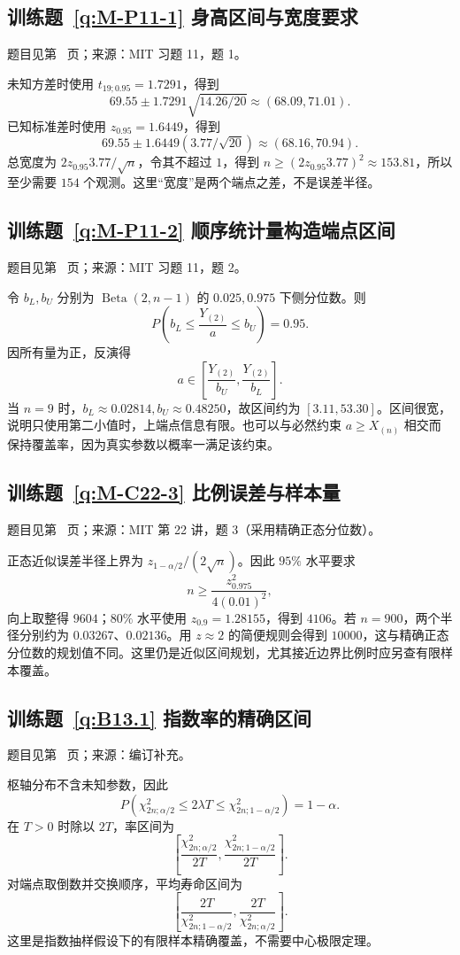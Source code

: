 \documentclass[UTF8,12pt,a4paper,fontset=fandol]{ctexbook}
\begin{document}
\subsection*{训练题~\ref{q:M-P11-1} 身高区间与宽度要求}\label{a:M-P11-1}{\small 题目见第~\pageref{q:M-P11-1} 页；来源：MIT 习题 11，题 1。}
\begin{solve}未知方差时使用 $t_{19;0.95}=1.7291$，得到\[69.55\pm1.7291\sqrt{14.26/20}\approx(68.09,71.01).\]已知标准差时使用 $z_{0.95}=1.6449$，得到\[69.55\pm1.6449(3.77/\sqrt{20})\approx(68.16,70.94).\]总宽度为 $2z_{0.95}3.77/\sqrt n$，令其不超过 $1$，得到 $n\ge(2z_{0.95}3.77)^2\approx153.81$，所以至少需要 $154$ 个观测。这里“宽度”是两个端点之差，不是误差半径。\end{solve}

\subsection*{训练题~\ref{q:M-P11-2} 顺序统计量构造端点区间}\label{a:M-P11-2}{\small 题目见第~\pageref{q:M-P11-2} 页；来源：MIT 习题 11，题 2。}
\begin{solve}令 $b_L,b_U$ 分别为 $\operatorname{Beta}(2,n-1)$ 的 $0.025,0.975$ 下侧分位数。则\[P\left(b_L\le\frac{Y_{(2)}}a\le b_U\right)=0.95.\]因所有量为正，反演得\[a\in\left[\frac{Y_{(2)}}{b_U},\frac{Y_{(2)}}{b_L}\right].\]当 $n=9$ 时，$b_L\approx0.02814,b_U\approx0.48250$，故区间约为 $[3.11,53.30]$。区间很宽，说明只使用第二小值时，上端点信息有限。也可以与必然约束 $a\ge X_{(n)}$ 相交而保持覆盖率，因为真实参数以概率一满足该约束。\end{solve}

\subsection*{训练题~\ref{q:M-C22-3} 比例误差与样本量}\label{a:M-C22-3}{\small 题目见第~\pageref{q:M-C22-3} 页；来源：MIT 第 22 讲，题 3（采用精确正态分位数）。}
\begin{solve}正态近似误差半径上界为 $z_{1-\alpha/2}/(2\sqrt n)$。因此 $95\%$ 水平要求\[n\ge\frac{z_{0.975}^2}{4(0.01)^2},\]向上取整得 $9604$；$80\%$ 水平使用 $z_{0.9}=1.28155$，得到 $4106$。若 $n=900$，两个半径分别约为 $0.03267$、$0.02136$。用 $z\approx2$ 的简便规则会得到 $10000$，这与精确正态分位数的规划值不同。这里仍是近似区间规划，尤其接近边界比例时应另查有限样本覆盖。\end{solve}

\subsection*{训练题~\ref{q:B13.1} 指数率的精确区间}\label{a:B13.1}{\small 题目见第~\pageref{q:B13.1} 页；来源：编订补充。}
\begin{solve}枢轴分布不含未知参数，因此\[P\left(\chi^2_{2n;\alpha/2}\le2\lambda T\le\chi^2_{2n;1-\alpha/2}\right)=1-\alpha.\]在 $T>0$ 时除以 $2T$，率区间为\[\left[\frac{\chi^2_{2n;\alpha/2}}{2T},\frac{\chi^2_{2n;1-\alpha/2}}{2T}\right].\]对端点取倒数并交换顺序，平均寿命区间为\[\left[\frac{2T}{\chi^2_{2n;1-\alpha/2}},\frac{2T}{\chi^2_{2n;\alpha/2}}\right].\]这里是指数抽样假设下的有限样本精确覆盖，不需要中心极限定理。\end{solve}
\end{document}
